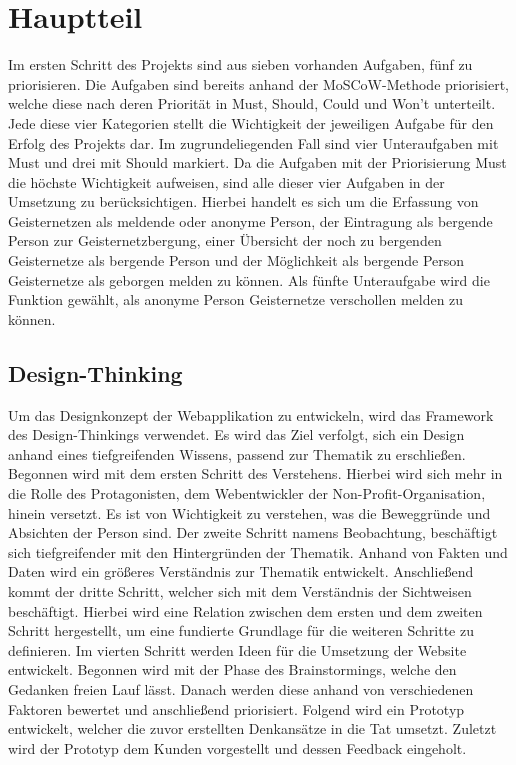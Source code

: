 \documentclass[11pt]{article}
\begin{document}
    \newpage


    \section{Hauptteil}
    Im ersten Schritt des Projekts sind aus sieben vorhanden Aufgaben, fünf zu priorisieren. Die Aufgaben sind bereits anhand der MoSCoW-Methode priorisiert, welche 
    diese nach deren Priorität in Must, Should, Could und Won't unterteilt. Jede diese vier Kategorien stellt die Wichtigkeit der jeweiligen Aufgabe für den Erfolg des Projekts dar.
    Im zugrundeliegenden Fall sind vier Unteraufgaben mit Must und drei mit Should markiert. Da die Aufgaben
    mit der Priorisierung Must die höchste Wichtigkeit aufweisen, sind alle dieser vier Aufgaben in der Umsetzung zu berücksichtigen.
    Hierbei handelt es sich um die Erfassung von Geisternetzen als meldende oder anonyme Person, der Eintragung 
    als bergende Person zur Geisternetzbergung, einer Übersicht der noch zu bergenden Geisternetze als bergende Person und
    der Möglichkeit als bergende Person Geisternetze als geborgen melden zu können. 
    Als fünfte Unteraufgabe wird die Funktion gewählt, als anonyme Person Geisternetze verschollen melden zu können.

    \subsection{Design-Thinking}
    Um das Designkonzept der Webapplikation zu entwickeln, wird das Framework des Design-Thinkings verwendet.
    Es wird das Ziel verfolgt, sich ein Design anhand eines tiefgreifenden Wissens, passend zur Thematik zu 
    erschließen. Begonnen wird mit dem ersten Schritt des Verstehens. Hierbei wird sich mehr in die Rolle
    des Protagonisten, dem Webentwickler der Non-Profit-Organisation, hinein versetzt. Es ist von Wichtigkeit zu verstehen, was die Beweggründe und
    Absichten der Person sind. Der zweite Schritt namens Beobachtung, beschäftigt sich tiefgreifender mit den Hintergründen der Thematik.
    Anhand von Fakten und Daten wird ein größeres Verständnis zur Thematik entwickelt. Anschließend kommt der dritte Schritt, welcher sich mit dem Verständnis
    der Sichtweisen beschäftigt. Hierbei wird eine Relation zwischen dem ersten und dem zweiten Schritt hergestellt, um eine fundierte Grundlage für die weiteren Schritte zu definieren. Im vierten Schritt werden Ideen für die Umsetzung der Website entwickelt. 
    Begonnen wird mit der Phase des Brainstormings, welche den Gedanken freien Lauf lässt. Danach werden diese anhand von verschiedenen Faktoren bewertet und anschließend priorisiert.
    Folgend wird ein Prototyp entwickelt, welcher die zuvor erstellten Denkansätze in die Tat umsetzt. Zuletzt wird der Prototyp dem Kunden vorgestellt und dessen Feedback eingeholt.
\end{document}
